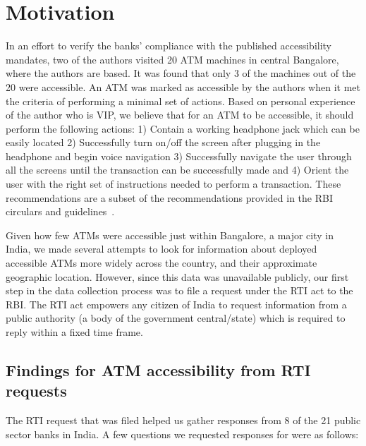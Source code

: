 \section{Motivation}
\label{sec:motivation}
In an effort to verify the banks' compliance with the published accessibility mandates, two of the authors visited 20 ATM machines in central Bangalore, where the authors are based. It was found that only 3 of the machines out of the 20 were accessible. An ATM was marked as accessible by the authors when it met the criteria of performing a minimal set of actions. Based on personal experience of the author who is VIP, we believe that for an ATM to be accessible, it should perform the following actions: 1) Contain a working headphone jack which can be easily located 2) Successfully turn on/off the screen after plugging in the headphone and begin voice navigation 3) Successfully navigate the user through all the screens until the transaction can be successfully made and 4) Orient the user with the right set of instructions needed to perform a transaction. These recommendations are a subset of the recommendations provided in the RBI circulars and guidelines~\cite{RBI2007, RBI2008, IBA2013b}.

Given how few ATMs were accessible just within Bangalore, a major city in India, we made several attempts to look for information about deployed accessible ATMs more widely across the country, and their approximate geographic location. However, since this data was unavailable publicly, our first step in the data collection process was to file a request under the RTI act to the RBI. The RTI act empowers any citizen of India to request information from a public authority (a body of the government central/state) which is required to reply within a fixed time frame.

\subsection{Findings for ATM accessibility from RTI requests}
\label{ssec:findingsRTI}

The RTI request that was filed helped us gather responses from 8 of the 21 public sector banks in India. A few questions we requested responses for were as follows:

